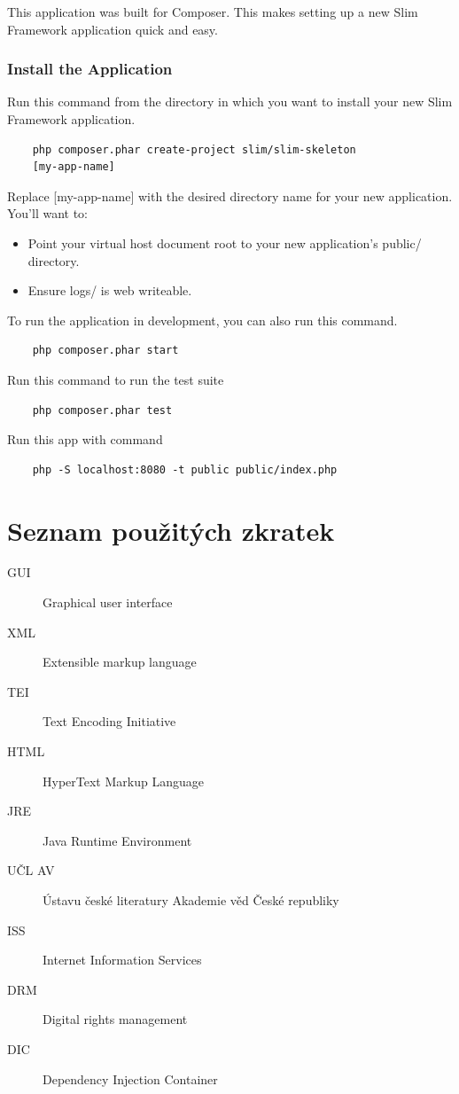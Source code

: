 \documentclass[thesis=B,czech]{FITthesis}[2012/06/26]
\begin{document}
        This application was built for Composer. This makes setting up a new Slim Framework application quick and easy.

        \subsection{Install the Application}
            Run this command from the directory in which you want to install your new Slim Framework application.
            \begin{lstlisting}
    php composer.phar create-project slim/slim-skeleton 
    [my-app-name]
            \end{lstlisting}
            Replace [my-app-name] with the desired directory name for your new application. You'll want to:

            \begin{itemize}
                \item Point your virtual host document root to your new application's public/ directory.
                \item Ensure logs/ is web writeable.
            \end{itemize}
            To run the application in development, you can also run this command.
            \begin{lstlisting}
    php composer.phar start
            \end{lstlisting}
            Run this command to run the test suite
            \begin{lstlisting}
    php composer.phar test
            \end{lstlisting}
            Run this app with command
            \begin{lstlisting}
    php -S localhost:8080 -t public public/index.php
            \end{lstlisting}
\chapter{Seznam použitých zkratek}
\begin{description}
	\item[GUI] Graphical user interface
	\item[XML] Extensible markup language
	\item[TEI] Text Encoding Initiative
	\item[HTML] HyperText Markup Language
	\item[JRE] Java Runtime Environment
	\item[UČL AV] Ústavu české literatury Akademie věd České republiky
	\item[ISS] Internet Information Services
	\item[DRM] Digital rights management
	\item[DIC] Dependency Injection Container
\end{description}
\end{document}
